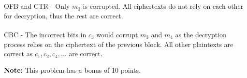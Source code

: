 \documentclass[12pt]{article}
\begin{document}
\begin{enumerate}
\begin{enumerate}
\\\\OFB and CTR - Only $m_3$ is corrupted. All ciphertexts do not rely on each other for decryption, thus the rest are correct.
\\\\CBC - The incorrect bits in $c_3$ would corrupt $m_3$ and $m_4$ as the decryption process relies on the ciphertext of the previous block. All other plaintexts are correct as $c_1, c_2, c_4, ...$ are correct. 
\end{enumerate} 


\end{enumerate}
\noindent\textbf{Note:} This problem has a bonus of 10 points.\\
\end{document}
